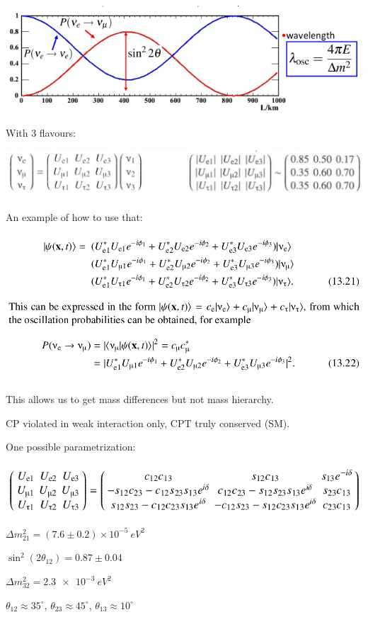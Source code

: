 \begin{center}
    \includegraphics[width=\linewidth]{images/neutrino_oscillations.png}
\end{center}
With 3 flavours:
\begin{center}
    \includegraphics[width=\linewidth]{images/pmns.png}
\end{center}
An example of how to use that:
\begin{center}
    \includegraphics[width=\linewidth]{images/pmns_example.png}
\end{center}
This allows us to get mass differences but not mass hierarchy.

CP violated in weak interaction only, CPT truly conserved (SM).

One possible parametrization:
\begin{center}
    \includegraphics[width=\linewidth]{images/pmns_parametrization.png}
\end{center}

$\Delta m_{21}^2 = (7.6 \pm 0.2) \times 10^{-5} \SI{}{eV^2}$

$\sin^2(2\theta_{12}) = 0.87 \pm 0.04$

$\Delta m_{32}^2 = \SI{2.3e-3}{eV^2}$

$\theta_{12} \approx 35^\circ$, $\theta_{23} \approx 45^\circ$, $\theta_{13} \approx 10^\circ$




